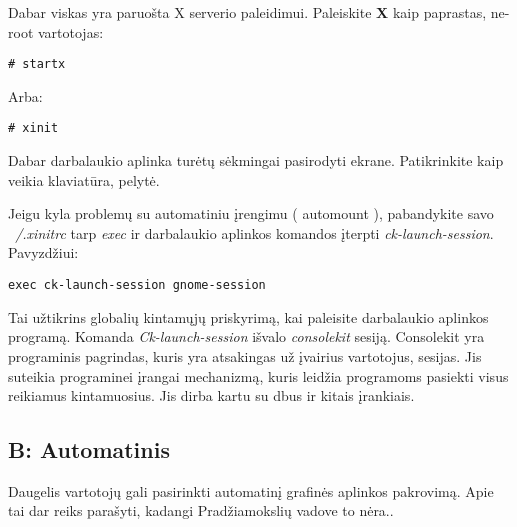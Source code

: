         Dabar viskas yra paruošta X serverio paleidimui. Paleiskite
        \textbf{X} kaip paprastas, ne-root vartotojas:

        \begin{verbatim}
# startx
        \end{verbatim}
        
        Arba:

        \begin{verbatim}
# xinit
        \end{verbatim}

        Dabar darbalaukio aplinka turėtų sėkmingai pasirodyti
        ekrane. Patikrinkite kaip veikia klaviatūra, pelytė.

        Jeigu kyla problemų su automatiniu įrengimu ( automount ),
        pabandykite savo \textsl{~/.xinitrc} tarp \textsl{exec} ir
        darbalaukio aplinkos komandos įterpti
        \textsl{ck-launch-session}. Pavyzdžiui:

        \begin{verbatim}
exec ck-launch-session gnome-session
        \end{verbatim}

        Tai užtikrins globalių kintamųjų priskyrimą, kai paleisite
        darbalaukio aplinkos programą. Komanda
        \textsl{Ck-launch-session} išvalo \textsl{consolekit}
        sesiją. Consolekit yra programinis pagrindas, kuris yra
        atsakingas už įvairius vartotojus, sesijas. Jis suteikia
        programinei įrangai mechanizmą, kuris leidžia programoms
        pasiekti visus reikiamus kintamuosius. Jis dirba kartu su dbus
        ir kitais įrankiais.

    \subsection{B: Automatinis}

      Daugelis vartotojų gali pasirinkti automatinį grafinės aplinkos
      pakrovimą. Apie tai dar reiks parašyti, kadangi Pradžiamokslių
      vadove to nėra..
